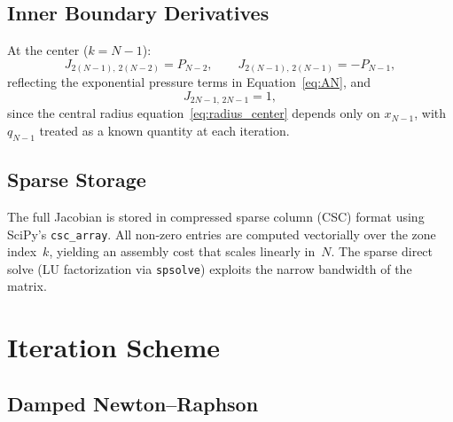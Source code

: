 \documentclass{aastex631}
\begin{document}
\subsection{Inner Boundary Derivatives}

At the center ($k=N-1$):
\begin{equation}
  J_{2(N-1),\,2(N-2)} = P_{N-2},\qquad
  J_{2(N-1),\,2(N-1)} = -P_{N-1},
\end{equation}
reflecting the exponential pressure terms in
Equation~\eqref{eq:AN}, and
\begin{equation}
  J_{2N-1,\,2N-1} = 1,
\end{equation}
since the central radius equation~\eqref{eq:radius_center} depends
only on $x_{N-1}$, with $q_{N-1}$ treated as a known quantity at
each iteration.

\subsection{Sparse Storage}

The full Jacobian is stored in compressed sparse column (CSC) format
using SciPy's \texttt{csc\_array}.  All non-zero entries are computed
vectorially over the zone index~$k$, yielding an assembly cost that
scales linearly in~$N$.  The sparse direct solve (LU factorization via
\texttt{spsolve}) exploits the narrow bandwidth of the matrix.

\section{Iteration Scheme}\label{sec:iteration}

\subsection{Damped Newton--Raphson}
\end{document}
